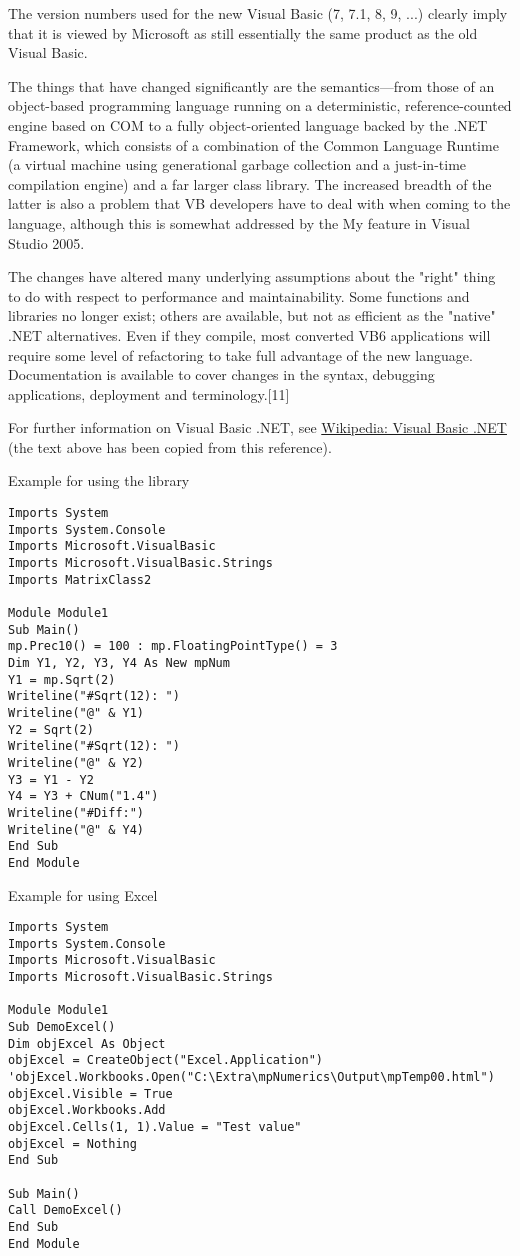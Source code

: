\vpara
The version numbers used for the new Visual Basic (7, 7.1, 8, 9, ...) clearly imply that it is viewed by Microsoft as still essentially the same product as the old Visual Basic.

\vpara
The things that have changed significantly are the semantics—from those of an object-based programming language running on a deterministic, reference-counted engine based on COM to a fully object-oriented language backed by the .NET Framework, which consists of a combination of the Common Language Runtime (a virtual machine using generational garbage collection and a just-in-time compilation engine) and a far larger class library. The increased breadth of the latter is also a problem that VB developers have to deal with when coming to the language, although this is somewhat addressed by the My feature in Visual Studio 2005.

\vpara
The changes have altered many underlying assumptions about the "right" thing to do with respect to performance and maintainability. Some functions and libraries no longer exist; others are available, but not as efficient as the "native" .NET alternatives. Even if they compile, most converted VB6 applications will require some level of refactoring to take full advantage of the new language. Documentation is available to cover changes in the syntax, debugging applications, deployment and terminology.[11]

\vpara
For further information on Visual Basic .NET, see \href{http://en.wikipedia.org/wiki/Visual_Basic_.NET}{Wikipedia: Visual Basic .NET} (the text above has been copied from this reference).


\vpara
Example for using the library


\begin{lstlisting}
Imports System
Imports System.Console
Imports Microsoft.VisualBasic
Imports Microsoft.VisualBasic.Strings
Imports MatrixClass2

Module Module1
Sub Main()
mp.Prec10() = 100 : mp.FloatingPointType() = 3
Dim Y1, Y2, Y3, Y4 As New mpNum
Y1 = mp.Sqrt(2)
Writeline("#Sqrt(12): ")
Writeline("@" & Y1)
Y2 = Sqrt(2)
Writeline("#Sqrt(12): ")
Writeline("@" & Y2)
Y3 = Y1 - Y2
Y4 = Y3 + CNum("1.4")
Writeline("#Diff:")
Writeline("@" & Y4)
End Sub
End Module
\end{lstlisting}


\vpara
Example for using Excel

\begin{lstlisting}
Imports System
Imports System.Console
Imports Microsoft.VisualBasic
Imports Microsoft.VisualBasic.Strings

Module Module1
Sub DemoExcel()
Dim objExcel As Object
objExcel = CreateObject("Excel.Application")
'objExcel.Workbooks.Open("C:\Extra\mpNumerics\Output\mpTemp00.html")
objExcel.Visible = True
objExcel.Workbooks.Add
objExcel.Cells(1, 1).Value = "Test value"
objExcel = Nothing
End Sub

Sub Main()
Call DemoExcel()
End Sub
End Module
\end{lstlisting}



